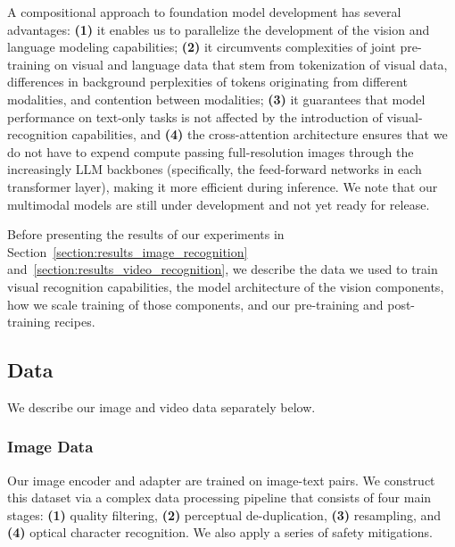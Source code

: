 A compositional approach to foundation model development has several advantages: \textbf{(1)} it enables us to parallelize the development of the vision and language modeling capabilities; \textbf{(2)} it circumvents complexities of joint pre-training on visual and language data that stem from tokenization of visual data, differences in background perplexities of tokens originating from different modalities, and contention between modalities; \textbf{(3)} it guarantees that model performance on text-only tasks is not affected by the introduction of visual-recognition capabilities, and \textbf{(4)} the cross-attention architecture ensures that we do not have to expend compute passing full-resolution images through the increasingly LLM backbones (specifically, the feed-forward networks in each transformer layer), making it more efficient during inference. We note that our multimodal models are still under development and not yet ready for release.

Before presenting the results of our experiments in Section~\ref{section:results_image_recognition} and~\ref{section:results_video_recognition}, we describe the data we used to train visual recognition capabilities, the model architecture of the vision components, how we scale training of those components, and our pre-training and post-training recipes.

\subsection{Data}
\label{section:vision_data}
We describe our image and video data separately below.

\subsubsection{Image Data}
\label{subsubsection:vision_data_image}
Our image encoder and adapter are trained on image-text pairs. We construct this dataset via a complex data processing pipeline that consists of four main stages: \textbf{(1)} quality filtering, \textbf{(2)} perceptual de-duplication, \textbf{(3)} resampling, and \textbf{(4)} optical character recognition. We also apply a series of safety mitigations.

